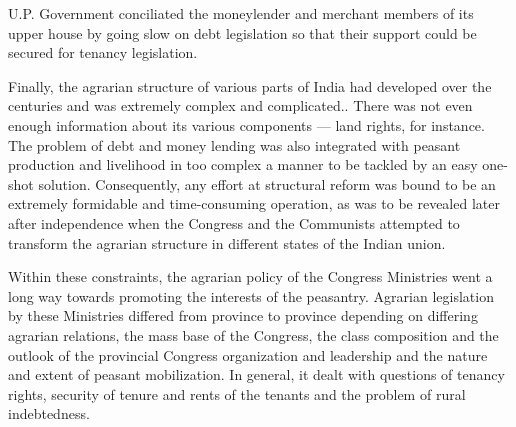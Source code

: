 \begin{multicols}{2}
U.P. Government conciliated the moneylender and merchant members of its upper house by going slow on debt legislation so that their support could be secured for tenancy legislation. 

Finally, the agrarian structure of various parts of India had developed over the centuries and was extremely complex and complicated.. There was not even enough information about its various components --- land rights, for instance. The problem of debt and money lending was also integrated with peasant production and livelihood in too complex a manner to be tackled by an easy one-shot solution. Consequently, any effort at structural reform was bound to be an extremely formidable and time-consuming operation, as was to be revealed later after independence when the Congress and the Communists attempted to transform the agrarian structure in different states of the Indian union. 

Within these constraints, the agrarian policy of the Congress Ministries went a long way towards promoting the interests of the peasantry. Agrarian legislation by these Ministries differed from province to province depending on differing agrarian relations, the mass base of the Congress, the class composition and the outlook of the provincial Congress organization and leadership and the nature and extent of peasant mobilization. In general, it dealt with questions of tenancy rights, security of tenure and rents of the tenants and the problem of rural indebtedness. 


\end{multicols}
